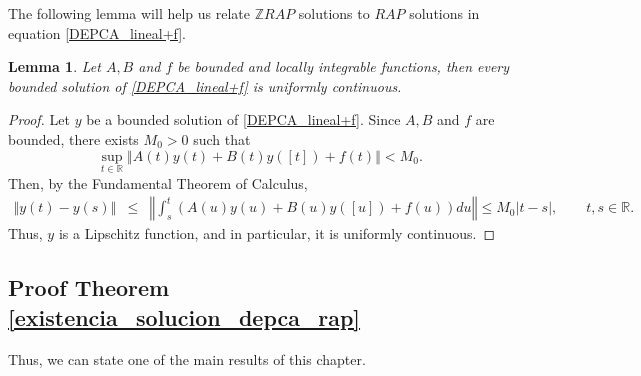 \documentclass[english,,reqno]{amsart}
\numberwithin{equation}{section}
\theoremstyle{plain}
\newtheorem{lem}[thm]{Lemma}
\theoremstyle{definition}
\theoremstyle{remark}
\begin{document}
The following lemma will help us relate $\mathbb{Z}RAP$ solutions to $RAP$ solutions in equation \eqref{DEPCA_lineal+f}.  
\begin{lem}\label{sol_DEPCA_uniform_continua}
Let $A, B$ and $f$ be bounded and locally integrable functions, then every bounded solution of \eqref{DEPCA_lineal+f} is uniformly continuous.
\end{lem}

\begin{proof}
Let $y$ be a bounded solution of \eqref{DEPCA_lineal+f}.  
Since $A, B$ and $f$ are bounded, there exists $M_0 > 0$ such that  
\[
\sup_{t \in \mathbb{R}} \left\Vert A(t)y(t) + B(t)y([t]) + f(t) \right\Vert < M_0.
\]  
Then, by the Fundamental Theorem of Calculus,  
\begin{eqnarray*}
\Vert y(t) - y(s) \Vert &\leq& \left\Vert \int_{s}^{t} \left( A(u)y(u) + B(u)y([u]) + f(u) \right) du \right\Vert \leq M_0 |t - s|,\quad\quad t,s\in\mathbb{R}.
\end{eqnarray*}  
Thus, $y$ is a Lipschitz function, and in particular, it is uniformly continuous.
\end{proof}


\subsection{Proof Theorem \ref{existencia_solucion_depca_rap}} Thus, we can state one of the main results of this chapter.
\end{document}
